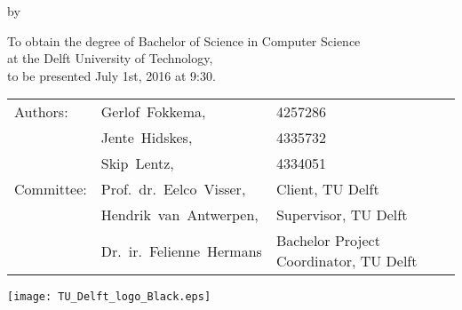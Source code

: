 \makecover

\begin{titlepage}
  \begin{center}
    {\makeatletter
    \largetitlestyle\fontsize{64}{94}\selectfont\@title
    \makeatother}

    {\makeatletter
    \ifx\@subtitle\undefined\else
        \bigskip
       {\tudsffamily\fontsize{22}{32}\selectfont\@subtitle}
    \fi
    \makeatother}

    \bigskip
    \bigskip

    by

    \bigskip
    \bigskip

    {\makeatletter
    \largetitlestyle\fontsize{26}{26}\selectfont\@author
    \makeatother}

    \bigskip
    \bigskip
    \vfill

    {\large
      To obtain the degree of Bachelor of Science in Computer
      Science\\
      at the Delft University of Technology,\\
      to be presented July 1st, 2016 at 9:30.
    }

    \bigskip
    \bigskip
    \vfill

    \begin{tabular}{lll}
      Authors:   & Gerlof~Fokkema,           & 4257286 \\
                 & Jente~Hidskes,            & 4335732 \\
                 & Skip~Lentz,               & 4334051 \\
      Committee: & Prof.~dr.~Eelco~Visser,   & Client, TU Delft \\
                 & Hendrik~van~Antwerpen,    & Supervisor, TU Delft \\
                 & Dr.~ir.~Felienne~Hermans  & Bachelor Project
                                               Coordinator, TU Delft
    \end{tabular}

    \vfill
    \texttt{[image: TU\_Delft\_logo\_Black.eps]}
  \end{center}
\end{titlepage}

